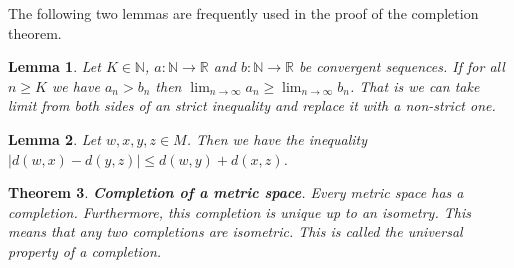 \documentclass[10pt]{article}
\newtheorem{thm}{Theorem}
\newtheorem{lem}[thm]{Lemma}
\theoremstyle{definition}
\theoremstyle{remark}
\begin{document}
The following two lemmas are frequently used in the proof of the completion theorem.

\begin{lem}
Let $K\in\mathbb{N}$, $a:\mathbb{N}\to \mathbb{R}$ and $b:\mathbb{N}\to \mathbb{R}$ be convergent sequences. If for all $n \ge K$ we have $a_n > b_n$ then $\lim_{n\to\infty}a_n \ge \lim_{n\to\infty}b_n$. That is we can take limit from both sides of an strict inequality and replace it with a non-strict one.
\label{ineq:lim}
\end{lem}

\begin{lem}
Let $w, x, y, z\in M$. Then we have the inequality $\left|d(w,x)-d(y,z)\right|\leq d(w,y)+d(x,z)$.
\label{inv:tri}
\end{lem}

\begin{thm}
\textbf{Completion of a metric space}. Every metric space has a completion. Furthermore, this completion is unique up to an isometry. This means that any two completions are isometric. This is called the universal property of a completion.
\end{thm}
\end{document}
